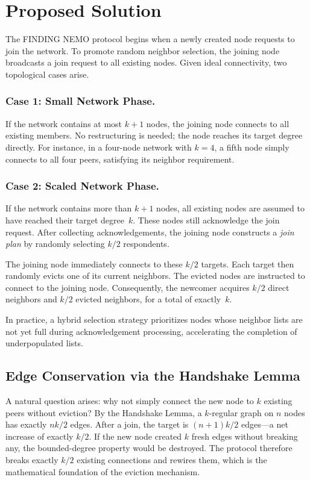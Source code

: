 \documentclass[runningheads]{llncs}
\begin{document}
\section{Proposed Solution}
\label{sec:proposed}
The FINDING NEMO protocol begins when a newly created node requests to join the network. To promote random neighbor selection, the joining node broadcasts a join request to all existing nodes. Given ideal connectivity, two topological cases arise.

\subsubsection{Case 1: Small Network Phase.}
If the network contains at most $k+1$ nodes, the joining node connects to all existing members. No restructuring is needed; the node reaches its target degree directly. For instance, in a four-node network with $k=4$, a fifth node simply connects to all four peers, satisfying its neighbor requirement.

\subsubsection{Case 2: Scaled Network Phase.}
If the network contains more than $k+1$ nodes, all existing nodes are assumed to have reached their target degree~$k$. These nodes still acknowledge the join request. After collecting acknowledgements, the joining node constructs a \textit{join plan} by randomly selecting $k/2$ respondents.

The joining node immediately connects to these $k/2$ targets. Each target then randomly evicts one of its current neighbors. The evicted nodes are instructed to connect to the joining node. Consequently, the newcomer acquires $k/2$ direct neighbors and $k/2$ evicted neighbors, for a total of exactly~$k$.

In practice, a hybrid selection strategy prioritizes nodes whose neighbor lists are not yet full during acknowledgement processing, accelerating the completion of underpopulated lists.

\subsection{Edge Conservation via the Handshake Lemma}
A natural question arises: why not simply connect the new node to $k$ existing peers without eviction? By the Handshake Lemma, a $k$-regular graph on $n$ nodes has exactly $nk/2$ edges. After a join, the target is $(n+1)k/2$ edges---a net increase of exactly $k/2$. If the new node created $k$ fresh edges without breaking any, the bounded-degree property would be destroyed. The protocol therefore breaks exactly $k/2$ existing connections and rewires them, which is the mathematical foundation of the eviction mechanism.
\end{document}
